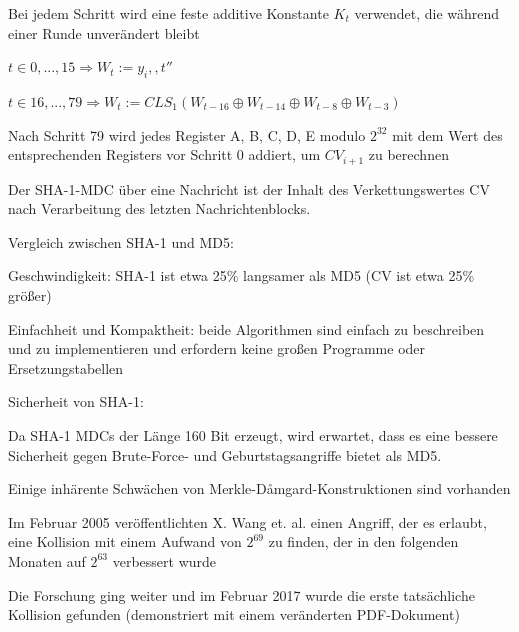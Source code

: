 \documentclass[a4paper]{article}
\begin{document}
\begin{multicols}{3}
\begin{itemize*}
\begin{itemize*}
\begin{itemize*}
                        \item Bei jedem Schritt wird eine feste additive Konstante $K_t$ verwendet, die während einer Runde unverändert bleibt
                  \end{itemize*}
            \end{itemize*}
            \begin{itemize*}
                  \item $t\in{0,...,15}\Rightarrow W_t:= y_i,,t''$
                  \item $t\in{16,...,79}\Rightarrow W_t:=CLS_1(W_{t-16}\oplus W_{t-14}\oplus W_{t-8} \oplus W_{t-3})$
                  \item Nach Schritt 79 wird jedes Register A, B, C, D, E modulo $2^{32}$ mit dem Wert des entsprechenden Registers vor Schritt 0 addiert, um $CV_{i+1}$ zu berechnen
            \end{itemize*}
            \item Der SHA-1-MDC über eine Nachricht ist der Inhalt des Verkettungswertes CV nach Verarbeitung des letzten Nachrichtenblocks.
            \item Vergleich zwischen SHA-1 und MD5:
            \begin{itemize*}
                  \item Geschwindigkeit: SHA-1 ist etwa 25\% langsamer als MD5 (CV ist etwa 25\% größer)
                  \item Einfachheit und Kompaktheit: beide Algorithmen sind einfach zu beschreiben und zu implementieren und erfordern keine großen Programme oder Ersetzungstabellen
            \end{itemize*}
            \item Sicherheit von SHA-1:
            \begin{itemize*}
                  \item Da SHA-1 MDCs der Länge 160 Bit erzeugt, wird erwartet, dass es eine bessere Sicherheit gegen Brute-Force- und Geburtstagsangriffe bietet als MD5.
                  \item Einige inhärente Schwächen von Merkle-Dåmgard-Konstruktionen sind vorhanden
                  \item Im Februar 2005 veröffentlichten X. Wang et. al. einen Angriff, der es erlaubt, eine Kollision mit einem Aufwand von $2^{69}$ zu finden, der in den folgenden Monaten auf $2^{63}$ verbessert wurde
                  \item Die Forschung ging weiter und im Februar 2017 wurde die erste tatsächliche Kollision gefunden (demonstriert mit einem veränderten PDF-Dokument)

\end{itemize*}
\end{itemize*}
\end{multicols}
\end{document}
